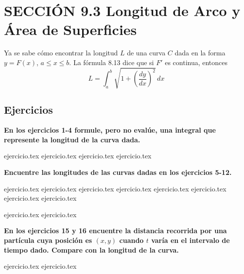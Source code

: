 
\section*{SECCIÓN 9.3 \quad Longitud de Arco y Área de Superficies}

Ya se sabe cómo encontrar la longitud $L$ de una curva $C$ dada en la forma $y = F(x)$, $a \le x \le b$. La fórmula 8.13 dice que si $F'$ es continua, entonces
\[ L = \int_a^b \sqrt{1 + \left(\frac{dy}{dx}\right)^2} \, dx \]

\subsection*{Ejercicios}

\noindent\textbf{En los ejercicios 1-4 formule, pero no evalúe, una integral que represente la longitud de la curva dada.}
\begin{enumerate}
    {ejercicio.tex}
{ejercicio.tex}
{ejercicio.tex}
{ejercicio.tex}
\end{enumerate}

\vspace{0.5cm}
\noindent\textbf{Encuentre las longitudes de las curvas dadas en los ejercicios 5-12.}
\begin{enumerate}
    \setcounter{enumi}{4}
    {ejercicio.tex}
{ejercicio.tex}
{ejercicio.tex}
{ejercicio.tex}
{ejercicio.tex}
{ejercicio.tex}
{ejercicio.tex}
{ejercicio.tex}
\end{enumerate}

\vspace{0.5cm}
\begin{enumerate}
    \setcounter{enumi}{12}
    {ejercicio.tex}
{ejercicio.tex}
\end{enumerate}

\vspace{0.5cm}
\noindent\textbf{En los ejercicios 15 y 16 encuentre la distancia recorrida por una partícula cuya posición es $(x, y)$ cuando $t$ varía en el intervalo de tiempo dado. Compare con la longitud de la curva.}
\begin{enumerate}
    \setcounter{enumi}{14}
    {ejercicio.tex}
{ejercicio.tex}
\end{enumerate}


